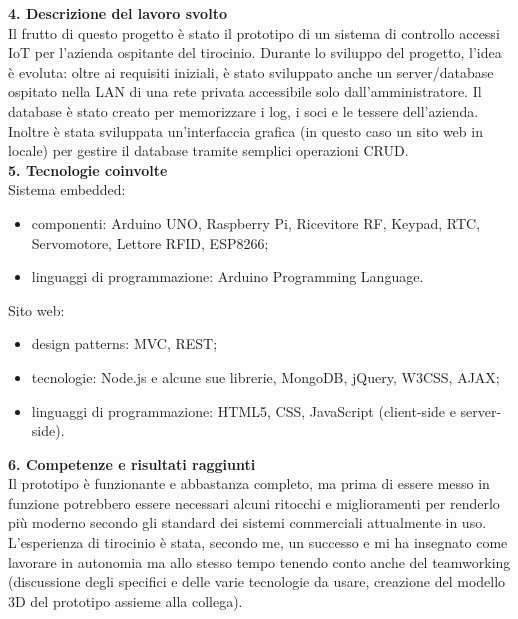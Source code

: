 \documentclass[11pt]{article}
\begin{document}
	\pagebreak
	\noindent\textbf{\large 4. Descrizione del lavoro svolto} \\
	\newline 
	Il frutto di questo progetto è stato il prototipo di un sistema di controllo accessi IoT \cite{IoT,smart_objects, controllo_accessi} per l'azienda ospitante del tirocinio. Durante lo sviluppo del progetto, l'idea è evoluta: oltre ai requisiti iniziali, è stato sviluppato anche un server/database ospitato nella LAN di una rete privata accessibile solo dall'amministratore. Il database è stato creato per memorizzare i log, i soci e le tessere dell'azienda. Inoltre è stata sviluppata un'interfaccia grafica (in questo caso un sito web in locale) per gestire il database tramite semplici operazioni CRUD. \\
	\newline
	\noindent\textbf{\large 5. Tecnologie coinvolte} \\
	\newline 
	Sistema embedded: 
	\begin{itemize}
		\item componenti: Arduino UNO\cite{sistemi_embedded_atrent}, Raspberry Pi, Ricevitore RF, Keypad, RTC, Servomotore, Lettore RFID, ESP8266\cite{esp_ds}; 
		\item linguaggi di programmazione: Arduino Programming Language.
	\end{itemize} 
	
	\noindent Sito web:
	\begin{itemize}
		\item design patterns: MVC, REST;
		\item tecnologie: Node.js e alcune sue librerie, MongoDB\cite{mongodb_driver, mongoose}, jQuery, W3CSS, AJAX;
		\item linguaggi di programmazione: HTML5, CSS, JavaScript (client-side e server-side).
		\\
	\end{itemize}
	\noindent\textbf{\large 6. Competenze e risultati raggiunti} \\
	\newline 
	\noindent Il prototipo è funzionante e abbastanza completo, ma prima di essere messo in funzione potrebbero essere necessari
	alcuni ritocchi e miglioramenti per renderlo più moderno secondo gli standard dei sistemi commerciali attualmente in uso.
	\newline
	L'esperienza di tirocinio è stata, secondo me, un successo e mi ha insegnato come lavorare in autonomia ma allo stesso tempo tenendo conto anche del teamworking (discussione degli specifici e delle varie tecnologie da usare, creazione del modello 3D del prototipo assieme alla collega).
	\newline
	
\end{document}
